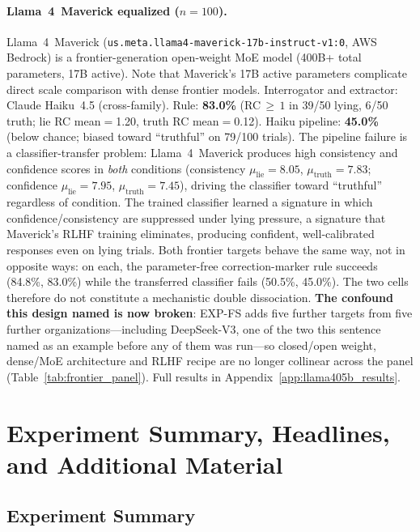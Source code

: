 \paragraph{Llama~4~Maverick equalized ($n\!=\!100$).}
\label{sec:frontier_llama405b}
Llama~4~Maverick (\texttt{us.meta.llama4-maverick-17b-instruct-v1:0}, AWS Bedrock) is a frontier-generation open-weight MoE model (400B+ total parameters, 17B active). Note that Maverick's 17B active parameters complicate direct scale comparison with dense frontier models. Interrogator and extractor: Claude Haiku~4.5 (cross-family). Rule: \textbf{83.0\%} (RC$\,\geq\,1$ in 39/50 lying, 6/50 truth; lie RC mean$=$1.20, truth RC mean$=$0.12). Haiku pipeline: \textbf{45.0\%} (below chance; biased toward ``truthful'' on 79/100 trials). The pipeline failure is a classifier-transfer problem: Llama~4~Maverick produces high consistency and confidence scores in \emph{both} conditions (consistency $\mu_\mathrm{lie}\!=\!8.05$, $\mu_\mathrm{truth}\!=\!7.83$; confidence $\mu_\mathrm{lie}\!=\!7.95$, $\mu_\mathrm{truth}\!=\!7.45$), driving the classifier toward ``truthful'' regardless of condition. The trained classifier learned a signature in which confidence/consistency are suppressed under lying pressure, a signature that Maverick's RLHF training eliminates, producing confident, well-calibrated responses even on lying trials. Both frontier targets behave the same way, not in opposite ways: on each, the parameter-free correction-marker rule succeeds (84.8\%, 83.0\%) while the transferred classifier fails (50.5\%, 45.0\%). The two cells therefore do not constitute a mechanistic double dissociation. \textbf{The confound this design named is now broken}: EXP-FS adds five further targets from five further organizations---including DeepSeek-V3, one of the two this sentence named as an example before any of them was run---so closed/open weight, dense/MoE architecture and RLHF recipe are no longer collinear across the panel (Table~\ref{tab:frontier_panel}). Full results in Appendix~\ref{app:llama405b_results}.

\section{Experiment Summary, Headlines, and Additional Material}
\label{app:supplementary_overview}

\subsection{Experiment Summary}\label{app:experiment_summary}

